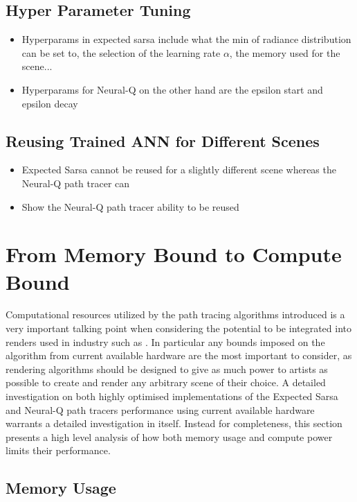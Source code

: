 \documentclass[../dissertation.tex]{subfiles}
\begin{document}
\subsection{Hyper Parameter Tuning}
\begin{itemize}
\item Hyperparams in expected sarsa include what the min of radiance distribution can be set to, the selection of the learning rate $\alpha$, the memory used for the scene...
\item Hyperparams for Neural-Q on the other hand are the epsilon start and epsilon decay
\end{itemize}

\subsection{Reusing Trained ANN for Different Scenes}
\begin{itemize}
\item Expected Sarsa cannot be reused for a slightly different scene whereas the Neural-Q path tracer can 
\item Show the Neural-Q path tracer ability to be reused
\end{itemize}


\section{From Memory Bound to Compute Bound}

Computational resources utilized by the path tracing algorithms introduced is a very important talking point when considering the potential to be integrated into renders used in industry such as \cite{georgiev2018arnold, christensen2018renderman, hyperion}. In particular any bounds imposed on the algorithm from current available hardware are the most important to consider, as rendering algorithms should be designed to give as much power to artists as possible to create and render any arbitrary scene of their choice. A detailed investigation on both highly optimised implementations of the Expected Sarsa and Neural-Q path tracers performance using current available hardware warrants a detailed investigation in itself. Instead for completeness, this section presents a high level analysis of how both memory usage and compute power limits their performance.

\subsection{Memory Usage}
\end{document}
